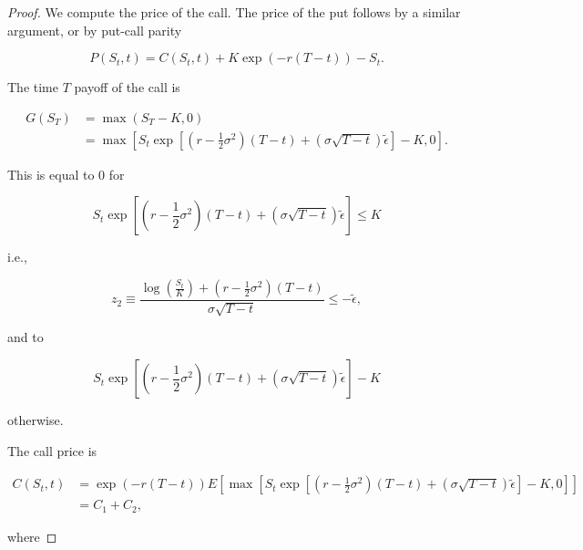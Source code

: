 \documentclass[\topdir/lecture\_notes.tex]{subfiles}
\begin{document}
\begin{proof}
We compute the price of the call. The price of the put follows by a similar argument, or by put-call parity

\begin{equation}
P\left(S_{t}, t\right)=C\left(S_{t}, t\right)+K \exp (-r(T-t))-S_{t} .
\end{equation}

The time \(T\) payoff of the call is

\begin{equation}
\begin{aligned}
G\left(S_{T}\right) & =\max \left(S_{T}-K, 0\right) \\
& =\max \left[S_{t} \exp \left[\left(r-\frac{1}{2} \sigma^{2}\right)(T-t)+(\sigma \sqrt{T-t}) \tilde{\epsilon}\right]-K, 0\right] .
\end{aligned}
\end{equation}

This is equal to 0 for

\begin{equation}
S_{t} \exp \left[\left(r-\frac{1}{2} \sigma^{2}\right)(T-t)+(\sigma \sqrt{T-t}) \tilde{\epsilon}\right] \leq K
\end{equation}

i.e.,

\begin{equation}
z_{2} \equiv \frac{\log \left(\frac{S_{t}}{K}\right)+\left(r-\frac{1}{2} \sigma^{2}\right)(T-t)}{\sigma \sqrt{T-t}} \leq-\tilde{\epsilon},
\end{equation}

and to

\begin{equation}
S_{t} \exp \left[\left(r-\frac{1}{2} \sigma^{2}\right)(T-t)+(\sigma \sqrt{T-t}) \tilde{\epsilon}\right]-K
\end{equation}

otherwise.

The call price is

\begin{equation}
\begin{aligned}
C\left(S_{t}, t\right) & =\exp (-r(T-t)) E\left[\max \left[S_{t} \exp \left[\left(r-\frac{1}{2} \sigma^{2}\right)(T-t)+(\sigma \sqrt{T-t}) \tilde{\epsilon}\right]-K, 0\right]\right] \\
& =C_{1}+C_{2},
\end{aligned}
\end{equation}

where


\end{proof}
\end{document}
